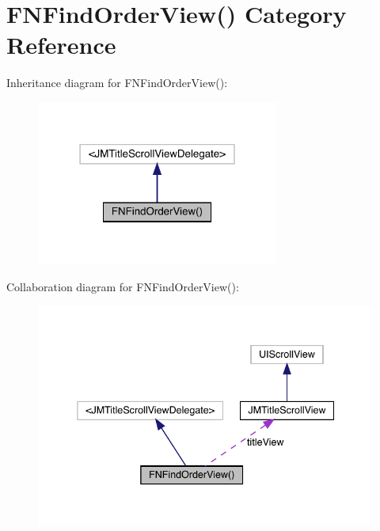 \hypertarget{category_f_n_find_order_view_07_08}{}\section{F\+N\+Find\+Order\+View() Category Reference}
\label{category_f_n_find_order_view_07_08}


Inheritance diagram for F\+N\+Find\+Order\+View()\+:\nopagebreak
\begin{figure}[H]
\begin{center}
\leavevmode
\includegraphics[width=226pt]{category_f_n_find_order_view_07_08__inherit__graph}
\end{center}
\end{figure}


Collaboration diagram for F\+N\+Find\+Order\+View()\+:\nopagebreak
\begin{figure}[H]
\begin{center}
\leavevmode
\includegraphics[width=338pt]{category_f_n_find_order_view_07_08__coll__graph}
\end{center}
\end{figure}
